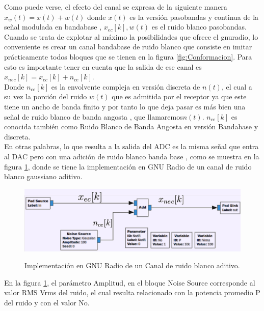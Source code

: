 Como puede verse, el efecto del canal se expresa de la siguiente manera $ x_{w}(t) = x(t) + w(t)$ donde $ x(t) $  es la versión pasobandas y continua de la señal modulada en bandabase , $ x_{ec}[k], w(t) $  es el ruido blanco pasobandas. \\
Cuando se trata de explotar al máximo la posibilidades que ofrece el gnuradio, lo conveniente es crear un canal bandabase de ruido blanco que consiste en imitar prácticamente todos bloques que se tienen en la figura \ref{fig:Conformacion}. Para esto es importante tener en cuenta que la salida de ese canal es $ x_{nec}[k] = x_{ec}[k] + n_{ce}[k] $. \\

Donde $ n_{ce}[k] $ es la envolvente compleja en versión discreta de $n(t)$, el cual a su vez la porción del ruido $ w(t)$ que es admitida por el receptor ya que este tiene un ancho de banda finito y por tanto lo que deja pasar es más bien una señal de ruido blanco de banda angosta , que  llamaremos$  n(t) $. $ n_{ce} [k] $ es conocida también como Ruido Blanco de Banda Angosta en versión Bandabase y discreta. \\

En otras palabras, lo que resulta a la salida del ADC es la misma señal que entra al DAC pero con una adición de ruido blanco banda base , como se muestra en  la figura \ref{fig:Implementacion}, donde se tiene la implementación en GNU Radio de un canal de ruido blanco gaussiano aditivo.\\

\vspace{200px}
\begin{figure}[h!]
\captionsetup{justification = raggedright, singlelinecheck = false}
\caption{Implementación en GNU Radio de un Canal de ruido blanco aditivo.} 
\centering
\includegraphics[scale=1]{Imagenes/Implementacion.png}
\label{fig:Implementacion}
\end{figure}

En la figura \ref{fig:Implementacion}, el parámetro Amplitud, en el bloque Noise Source corresponde al valor RMS Vrms del ruido, el cual resulta relacionado con la potencia promedio P del ruido y con el valor No.  \\

